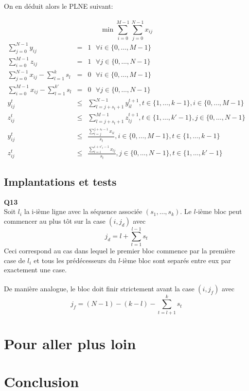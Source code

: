 \documentclass[10pt,a4paper]{article}
\begin{document}
\noindent
On en déduit alors le PLNE suivant: \\ \\
$$\min \sum_{i = 0}^{M-1} \sum_{j = 0}^{N-1} x_{ij}$$
\begin{eqnarray}
\sum_{j = 0}^{N-1} y_{ij} & = & 1 \ \ \ \forall i \in \lbrace 0, \hdots, M-1 \rbrace \\
\sum_{i = 0}^{M-1} z_{ij} & = & 1 \ \ \ \forall j \in \lbrace 0, \hdots, N-1 \rbrace \\
\sum_{j = 0}^{N-1} x_{ij} - \sum_{l = 1}^k s_l & = & 0 \ \ \ \forall i \in \lbrace 0, \hdots, M-1 \rbrace \\
\sum_{i = 0}^{M-1} x_{ij} - \sum_{l = 1}^{k'} s_l & = & 0 \ \ \  \forall j \in \lbrace 0, \hdots, N-1 \rbrace \\
y_{ij}^t & \leq & \sum_{l = j+s_t+1}^{N-1} y_{il}^{t+1} , t \in \lbrace 1, \hdots, k-1 \rbrace, i \in \lbrace 0, \hdots, M-1 \rbrace \\
z_{ij}^t & \leq & \sum_{l = j+s_t+1}^{M-1} z_{lj}^{t+1} , t \in \lbrace 1, \hdots, k'-1 \rbrace, j \in \lbrace 0, \hdots, N-1 \rbrace \\
y_{ij}^{t} & \leq & \frac{\sum_{l = j}^{j+s_t-1} x_{il}}{s_t} , i \in \lbrace 0, \hdots, M-1 \rbrace, t \in \lbrace 1, \hdots, k-1 \rbrace \\
z_{ij}^{t} & \leq & \frac{\sum_{l = i}^{i+s'_t-1} x_{lj}}{s_t}, j \in \lbrace 0, \hdots, N-1 \rbrace, t \in \lbrace 1, \hdots, k'-1 \rbrace
\end{eqnarray}

\subsection{Implantations et tests}
\noindent
\textbf{Q13} \\ 
\noindent
Soit $l_i$ la i-ième ligne avec la séquence associée $(s_1, \hdots, s_k)$. Le $l$-ième bloc peut commencer au plus tôt sur la case $(i,j_d)$ avec $$j_d = l + \sum_{t = 1}^ {l-1} s_t$$
Ceci correspond au cas dans lequel le premier bloc commence par la première case de $l_i$ et tous les prédécesseurs du $l$-ième bloc sont separés entre eux par exactement une case. \\ \\
\noindent
De manière analogue, le bloc doit finir strictement avant la case $(i, j_f)$ avec 
$$ j_f = (N-1) - (k-l) - \sum_{t = l+1}^k s_t$$

\section{Pour aller plus loin}
\section*{Conclusion}
\end{document}
